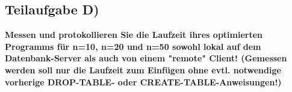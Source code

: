 \subsection{Teilaufgabe D)}
\textbf{Messen und protokollieren Sie die Laufzeit ihres optimierten Programms für n=10, n=20
und n=50 sowohl lokal auf dem Datenbank-Server als auch von einem "remote" Client!
(Gemessen werden soll nur die Laufzeit zum Einfügen ohne evtl. notwendige vorherige
DROP-TABLE- oder CREATE-TABLE-Anweisungen!)}

